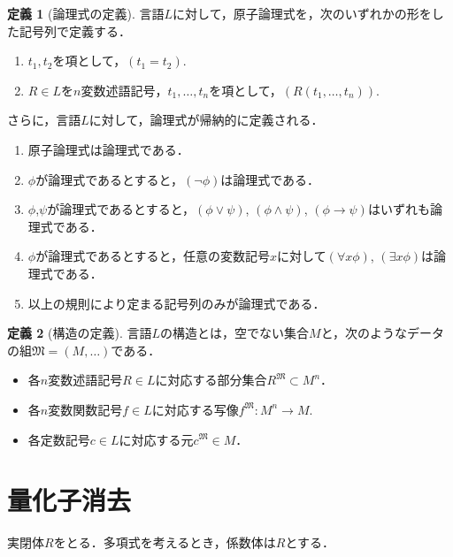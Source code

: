 \documentclass[uplatex, dvipdfmx]{jsarticle}
\newcommand{\map}[3]{{#1}:{#2}\rightarrow{#3}}
\theoremstyle{definition}
\newtheorem{definition}{定義}[section]
\begin{document}
\begin{definition}[論理式の定義]
     言語$L$に対して，原子論理式を，次のいずれかの形をした記号列で定義する．
     \begin{enumerate}
          \item $t_1, t_2$を項として，$(t_1=t_2)$.
          \item $R \in L$を$n$変数述語記号，$t_1, \dots, t_n$を項として，$(R(t_1, \dots, t_n))$.
     \end{enumerate}
     
     さらに，言語$L$に対して，論理式が帰納的に定義される．
     \begin{enumerate}
          \item 原子論理式は論理式である．
          \item $\phi$が論理式であるとすると，$(\lnot \phi)$は論理式である．
          \item $\phi$,$\psi$が論理式であるとすると，$(\phi \lor \psi)$, $(\phi \land \psi)$, $(\phi \rightarrow \psi)$はいずれも論理式である．
          \item $\phi$が論理式であるとすると，任意の変数記号$x$に対して$(\forall x \phi)$, $(\exists x \phi)$は論理式である．
          \item 以上の規則により定まる記号列のみが論理式である．
     \end{enumerate}
\end{definition}


\begin{definition}[構造の定義]
     言語$L$の構造とは，空でない集合$M$と，次のようなデータの組$\mathfrak{M}=(M,\dots)$である．
     \begin{itemize}
          \item 各$n$変数述語記号$R \in L$に対応する部分集合$R^\mathfrak{M} \subset M^n$．
          \item 各$n$変数関数記号$f \in L$に対応する写像$\map{f^\mathfrak{M}}{M^n}{M}$.
          \item 各定数記号$c \in L$に対応する元$c^\mathfrak{M} \in M$．
     \end{itemize}
\end{definition}

\section{量化子消去}
実閉体$R$をとる．多項式を考えるとき，係数体は$R$とする．
\end{document}

